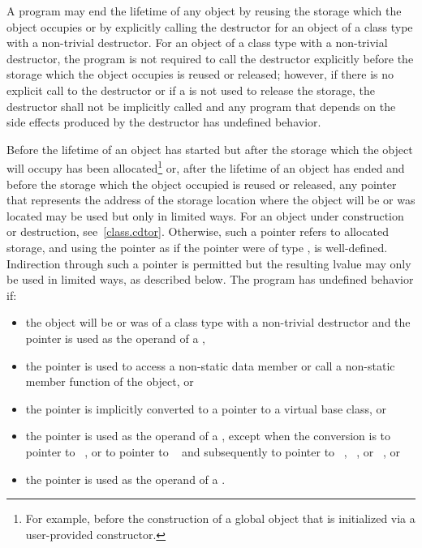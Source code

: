\pnum
A program may end the lifetime of any object by reusing the storage
which the object occupies or by explicitly calling the destructor for an
object of a class type with a non-trivial destructor. For an object of a
class type with a non-trivial destructor, the program is not required to
call the destructor explicitly before the storage which the object
occupies is reused or released; however, if there is no explicit call to
the destructor or if a 
is not used to release the storage, the destructor shall not be
implicitly called and any program that depends on the side effects
produced by the destructor has undefined behavior.

\pnum
Before the lifetime of an object has started but after the storage which
the object will occupy has been allocated\footnote{For example, before the
construction of a global object
that is initialized via a user-provided constructor.}
or, after the lifetime of an object has ended and before the storage
which the object occupied is reused or released, any pointer that represents the address of
the storage location where the object will be or was located may be
used but only in limited ways.
For an object under construction or destruction, see~\ref{class.cdtor}.
Otherwise, such
a pointer refers to allocated
storage, and using the pointer as
if the pointer were of type , is
well-defined. Indirection through such a pointer is permitted but the resulting lvalue may only be used in
limited ways, as described below. The
program has undefined behavior if:
\begin{itemize}
\item
  the object will be or was of a class type with a non-trivial destructor
  and the pointer is used as the operand of a ,
\item
  the pointer is used to access a non-static data member or call a
  non-static member function of the object, or
\item
  the pointer is implicitly converted to a pointer
  to a virtual base class, or
\item
  the pointer is used as the operand of a
  , except when the conversion
  is to pointer to \cv{}~, or to pointer to \cv{}~
  and subsequently to pointer to
  \cv{}~,
  \cv{}~, or
  \cv{}~, or
\item
  the pointer is used as the operand of a
  .
\end{itemize}
